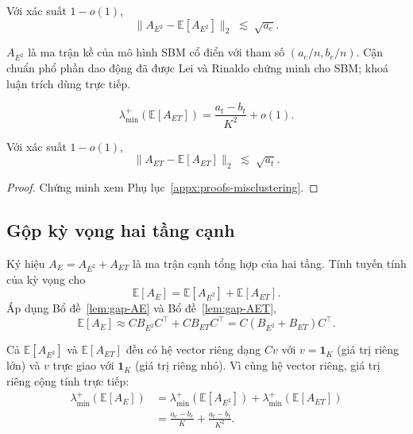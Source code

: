 \begin{lemma}
\label{lem:bound-AE}
Với xác suất $1 - o(1)$,
\[
    \|A_{E^2} - \mathbb{E}[A_{E^2}]\|_2 \;\lesssim\; \sqrt{a_e}.
\]
\end{lemma}

$A_{E^2}$ là ma trận kề của mô hình SBM cổ điển với tham số $(a_e/n, b_e/n)$. Cận chuẩn phổ phần dao động đã được Lei và Rinaldo \cite{lei2015} chứng minh cho SBM; khoá luận trích dùng trực tiếp.

\begin{lemma}
\label{lem:gap-AET}
\[
    \lambda_{\min}^+(\mathbb{E}[A_{ET}]) = \frac{a_t - b_t}{K^2} + o(1).
\]
\end{lemma}


\begin{lemma}
\label{lem:bound-AET}
Với xác suất $1 - o(1)$,
\[
    \|A_{ET} - \mathbb{E}[A_{ET}]\|_2 \;\lesssim\; \sqrt{a_t}.
\]
\end{lemma}

\begin{proof}
Chứng minh xem Phụ lục~\ref{appx:proofs-misclustering}.
\end{proof}

\subsection{Gộp kỳ vọng hai tầng cạnh}
\label{subsec:apply-bound}

Ký hiệu $A_E = A_{E^2} + A_{ET}$ là ma trận cạnh tổng hợp của hai tầng. Tính tuyến tính của kỳ vọng cho
\[
    \mathbb{E}[A_E] = \mathbb{E}[A_{E^2}] + \mathbb{E}[A_{ET}].
\]
Áp dụng Bổ đề~\ref{lem:gap-AE} và Bổ đề~\ref{lem:gap-AET},
\[
    \mathbb{E}[A_E] \approx C B_{E^2} C^\top + C B_{ET} C^\top = C (B_{E^2} + B_{ET}) C^\top.
\]

Cả $\mathbb{E}[A_{E^2}]$ và $\mathbb{E}[A_{ET}]$ đều có hệ vector riêng dạng $Cv$ với $v = \mathbf{1}_K$ (giá trị riêng lớn) và $v$ trực giao với $\mathbf{1}_K$ (giá trị riêng nhỏ). Vì cùng hệ vector riêng, giá trị riêng cộng tính trực tiếp:
\begin{align*}
    \lambda_{\min}^+(\mathbb{E}[A_E])
        &= \lambda_{\min}^+(\mathbb{E}[A_{E^2}]) + \lambda_{\min}^+(\mathbb{E}[A_{ET}]) \\
        &= \frac{a_e - b_e}{K} + \frac{a_t - b_t}{K^2}.
\end{align*}

